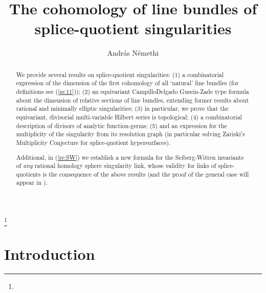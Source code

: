 \documentclass[10pt,a4paper]{amsart}
\numberwithin{equation}{section}
\numberwithin{equation}{subsection}
\theoremstyle{plain}
\theoremstyle{definition}
\begin{document}
\title{The cohomology of line bundles of splice-quotient singularities}

\date{}

\author{Andr\'as N\'emethi}
\thanks{}
\address{R\'enyi Institute of Mathematics\\
  Budapest\\
  Re\'altanoda u. 13\\
  1053\\
 Hungary}



\begin{abstract}
We provide several results on splice-quotient singularities: (1) a
combinatorial expression of the dimension of the first cohomology
of all `natural' line bundles (for definitions see (\ref{ss:11}));
(2) an equivariant Campillo\textendash Delgado \textendash
Gusein-Zade type formula about the dimension of relative sections
of line bundles,  extending former results about rational and
minimally elliptic singularities;  (3)  in particular, we prove
that the equivariant, divisorial multi-variable Hilbert series is
topological;  (4)  a combinatorial description of  divisors of
analytic function-germs; (5) and  an expression for  the
multiplicity of the singularity from its resolution graph (in
particular solving Zariski's Multiplicity Conjecture for
splice-quotient hypersurfaces).

Additional, in (\ref{re:SW}) we establish a new formula for the Seiberg-Witten
invariants of {\em any} rational homology sphere singularity link,
whose validity for links of splice-quotients is the consequence of the 
above results (and the proof of the
general case will appear in \cite{NSW}).   
\end{abstract}

\maketitle

\section{Introduction}\label{sec:introduction}
\end{document}

